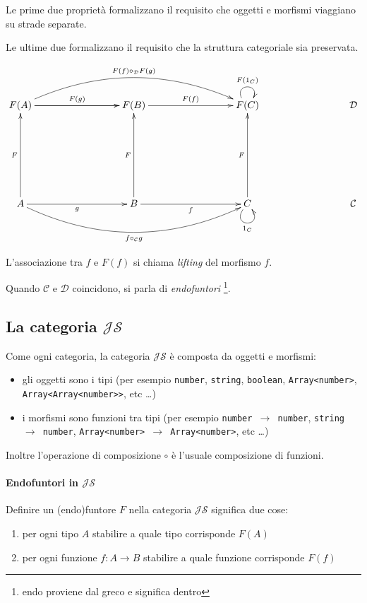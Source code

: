 \documentclass[12pt]{article}
\begin{document}
Le prime due proprietà formalizzano il requisito che oggetti e morfismi viaggiano su strade separate.

Le ultime due formalizzano il requisito che la struttura categoriale sia preservata.

\[
\xymatrixrowsep{3cm}
\xymatrixcolsep{3cm}
\xymatrix{
  F(A) \ar[r]^{F(g)} \ar[r] \ar@/^1cm/[rr]^{F(f) \circ_\mathcal{D} F(g)} & F(B) \ar[r]^{F(f)} & F(C) \ar@(ul,ur)^{F(1_C)} & \mathcal{D} \\
  A \ar[u]^F \ar[r]_g \ar@/_1cm/[rr]_{f \circ_\mathcal{C} g}  & B \ar[u]^F \ar[r]_f & C \ar[u]^F \ar@(dl,dr)_{1_C} & \mathcal{C}
}
\]

L'associazione tra $f$ e $F(f)$ si chiama \emph{lifting} del morfismo $f$.

Quando $\mathcal{C}$ e $\mathcal{D}$ coincidono, si parla di \emph{endofuntori} \footnote{endo proviene dal greco e significa dentro}.

\subsection{La categoria $\mathcal{JS}$}

Come ogni categoria, la categoria $\mathcal{JS}$ è composta da oggetti e morfismi:

\begin{itemize}
  \item gli oggetti sono i tipi (per esempio \texttt{number}, \texttt{string}, \texttt{boolean}, \texttt{Array<number>}, \texttt{Array<Array<number>>}, etc \ldots)
  \item i morfismi sono funzioni tra tipi (per esempio \texttt{number $\rightarrow$ number}, \texttt{string $\rightarrow$ number}, \texttt{Array<number> $\rightarrow$ Array<number>}, etc \ldots)
\end{itemize}

Inoltre l'operazione di composizione $\circ$ è l'usuale composizione di funzioni.

\paragraph{Endofuntori in $\mathcal{JS}$}

Definire un (endo)funtore $F$ nella categoria $\mathcal{JS}$ significa due cose:

\begin{enumerate}
  \item per ogni tipo $A$ stabilire a quale tipo corrisponde $F(A)$
  \item per ogni funzione $f: A \rightarrow B$ stabilire a quale funzione corrisponde $F(f)$
\end{enumerate}
\end{document}
